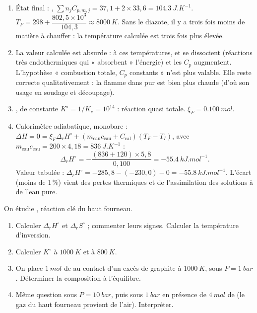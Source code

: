 \correction
\begin{enumerate}
  \item État final : , $\sum n_jC_{p,m,j} = 37{,}1 + 2\times33{,}6 = \SI{104,3}{J.K^{-1}}$. $T_F = 298 + \dfrac{802{,}5\times10^3}{104{,}3} \approx \SI{8000}{K}$. Sans le diazote, il y a trois fois moins de matière à chauffer : la température calculée est trois fois plus élevée.
  \item La valeur calculée est absurde : à ces températures,  et  se dissocient (réactions très endothermiques qui « absorbent » l'énergie) et les $C_p$ augmentent. L'hypothèse « combustion totale, $C_p$ constants » n'est plus valable. Elle reste correcte qualitativement : la flamme dans  pur est bien plus chaude (d'où son usage en soudage et découpage).
  \item {}, de constante $K^\circ = 1/K_e = 10^{14}$ : réaction quasi totale. $\xi_F = \SI{0,100}{mol}$.
  \item Calorimètre adiabatique, monobare : $\Delta H = 0 = \xi_F\Delta_rH^\circ + (m_{\text{eau}}c_{\text{eau}} + C_{\text{cal}})(T_F - T_I)$, avec $m_{\text{eau}}c_{\text{eau}} = 200\times4{,}18 = \SI{836}{J.K^{-1}}$ :
  \[ \Delta_rH^\circ = -\frac{(836 + 120)\times5{,}8}{0{,}100} = \SI{-55,4}{kJ.mol^{-1}}. \]
  Valeur tabulée : $\Delta_rH^\circ = -285{,}8 - (-230{,}0) - 0 = \SI{-55,8}{kJ.mol^{-1}}$. L'écart (moins de 1\,\%) vient des pertes thermiques et de l'assimilation des solutions à de l'eau pure.
\end{enumerate}

\label{exo:boudouard}
On étudie , réaction clé du haut fourneau.
\begin{enumerate}
  \item Calculer $\Delta_rH^\circ$ et $\Delta_rS^\circ$ ; commenter leurs signes. Calculer la température d'inversion.
  \item Calculer $K^\circ$ à $\SI{1000}{K}$ et à $\SI{800}{K}$.
  \item On place $\SI{1}{mol}$ de  au contact d'un excès de graphite à $\SI{1000}{K}$, sous $P = \SI{1}{bar}$. Déterminer la composition à l'équilibre.
  \item Même question sous $P = \SI{10}{bar}$, puis sous $\SI{1}{bar}$ en présence de $\SI{4}{mol}$ de  (le gaz du haut fourneau provient de l'air). Interpréter.
\end{enumerate}

